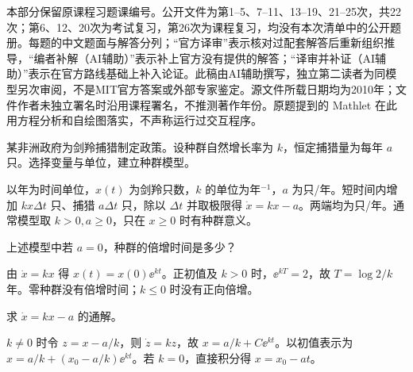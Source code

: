 本部分保留原课程习题课编号。公开文件为第1--5、7--11、13--19、21--25次，共22次；第6、12、20次为考试复习，第26次为课程复习，均没有本次清单中的公开题册。每题的中文题面与解答分列；“官方译审”表示核对过配套解答后重新组织推导，“编者补解（AI辅助）”表示补上官方没有提供的解答；“译审并补证（AI辅助）”表示在官方路线基础上补入论证。此稿由AI辅助撰写，独立第二读者为同模型另次审阅，不是MIT官方答案或外部专家鉴定。源文件所载日期均为2010年；文件作者未独立署名时沿用课程署名，不推测著作年份。原题提到的 Mathlet 在此用方程分析和自绘图落实，不声称运行过交互程序。

\begin{exercise}\label{cw:rec01-1}
某非洲政府为剑羚捕猎制定政策。设种群自然增长率为 $k$，恒定捕猎量为每年 $a$ 只。选择变量与单位，建立种群模型。
\end{exercise}
\begin{solution}
以年为时间单位，$x(t)$ 为剑羚只数，$k$ 的单位为年$^{-1}$，$a$ 为只/年。短时间内增加 $kx\Delta t$ 只、捕猎 $a\Delta t$ 只，除以 $\Delta t$ 并取极限得 $\dot x=kx-a$。两端均为只/年。通常模型取 $k>0,a\ge0$，只在 $x\ge0$ 时有种群意义。
\par{}
\end{solution}

\begin{exercise}\label{cw:rec01-2}
上述模型中若 $a=0$，种群的倍增时间是多少？
\end{exercise}
\begin{solution}
由 $\dot x=kx$ 得 $x(t)=x(0)\ee^{kt}$。正初值及 $k>0$ 时，$\ee^{kT}=2$，故 $T=\log2/k$ 年。零种群没有倍增时间；$k\le0$ 时没有正向倍增。
\par{}
\end{solution}

\begin{exercise}\label{cw:rec01-3}
求 $\dot x=kx-a$ 的通解。
\end{exercise}
\begin{solution}
$k\ne0$ 时令 $z=x-a/k$，则 $\dot z=kz$，故 $x=a/k+C\ee^{kt}$。以初值表示为 $x=a/k+(x_0-a/k)\ee^{kt}$。若 $k=0$，直接积分得 $x=x_0-at$。
\par{}
\end{solution}

